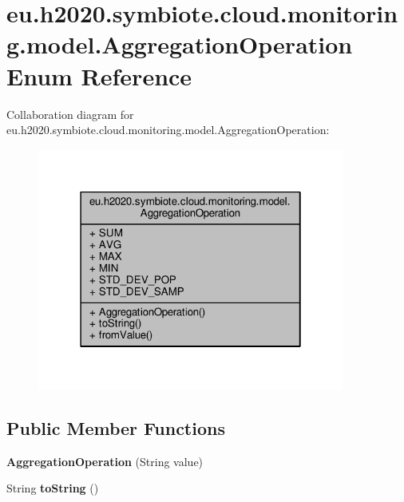 \hypertarget{enumeu_1_1h2020_1_1symbiote_1_1cloud_1_1monitoring_1_1model_1_1AggregationOperation}{}\section{eu.\+h2020.\+symbiote.\+cloud.\+monitoring.\+model.\+Aggregation\+Operation Enum Reference}
\label{enumeu_1_1h2020_1_1symbiote_1_1cloud_1_1monitoring_1_1model_1_1AggregationOperation}


Collaboration diagram for eu.\+h2020.\+symbiote.\+cloud.\+monitoring.\+model.\+Aggregation\+Operation\+:
\nopagebreak
\begin{figure}[H]
\begin{center}
\leavevmode
\includegraphics[width=286pt]{enumeu_1_1h2020_1_1symbiote_1_1cloud_1_1monitoring_1_1model_1_1AggregationOperation__coll__graph}
\end{center}
\end{figure}
\subsection*{Public Member Functions}
\begin{DoxyCompactItemize}
\item 
\mbox{\label{enumeu_1_1h2020_1_1symbiote_1_1cloud_1_1monitoring_1_1model_1_1AggregationOperation_a41e2560efe4e1114911b0be0d5ba87e1}} 
{\bfseries Aggregation\+Operation} (String value)
\item 
\mbox{\label{enumeu_1_1h2020_1_1symbiote_1_1cloud_1_1monitoring_1_1model_1_1AggregationOperation_aedb2b62c8d657a0658ed8d8404a495ba}} 
String {\bfseries to\+String} ()
\end{DoxyCompactItemize}
